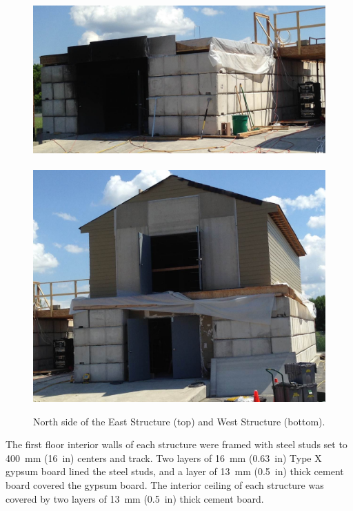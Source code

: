 \documentclass[12pt,oneside]{book}
\begin{document}
\begin{figure}[!ht]
	\includegraphics[width=5.25in]{../../Hose_Stream_Tests/Figures/Pictures/east_structure}
	\\~\\
	\includegraphics[width=5.25in]{../../Hose_Stream_Tests/Figures/Pictures/west_structure}
	\caption[North side of the East and West Structures.]{North side of the East Structure (top) and West Structure (bottom).}
	\label{fig:struct_pics}
\end{figure}

The first floor interior walls of each structure were framed with steel studs set to 400~mm (16~in) centers and track. Two layers of 16~mm (0.63~in) Type X gypsum board lined the steel studs, and a layer of 13~mm (0.5~in) thick cement board covered the gypsum board. The interior ceiling of each structure was covered by two layers of 13~mm (0.5~in) thick cement board.
\FloatBarrier
\end{document}

